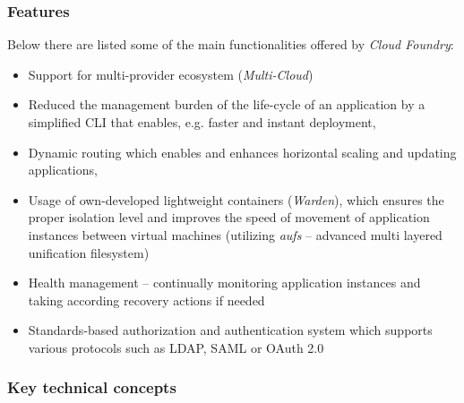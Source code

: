 \subsubsection{Features}
Below there are listed some of the main functionalities offered by \emph{Cloud Foundry}:
\begin{itemize}
  \item Support for multi-provider ecosystem (\emph{Multi-Cloud})
  \item Reduced the management burden of the life-cycle of an application by a simplified CLI that enables, e.g. faster and instant deployment,
  \item Dynamic routing which enables and enhances horizontal scaling and updating applications,
  \item Usage of own-developed lightweight containers (\emph{Warden}), which ensures the proper isolation level and improves the speed of movement of application instances between virtual machines (utilizing \emph{aufs} -- advanced multi layered unification filesystem)
  \item Health management -- continually monitoring application instances and taking according recovery actions if needed
  \item Standards-based authorization and authentication system which supports various protocols such as LDAP, SAML or OAuth 2.0
\end{itemize}

\subsubsection{Key technical concepts}

